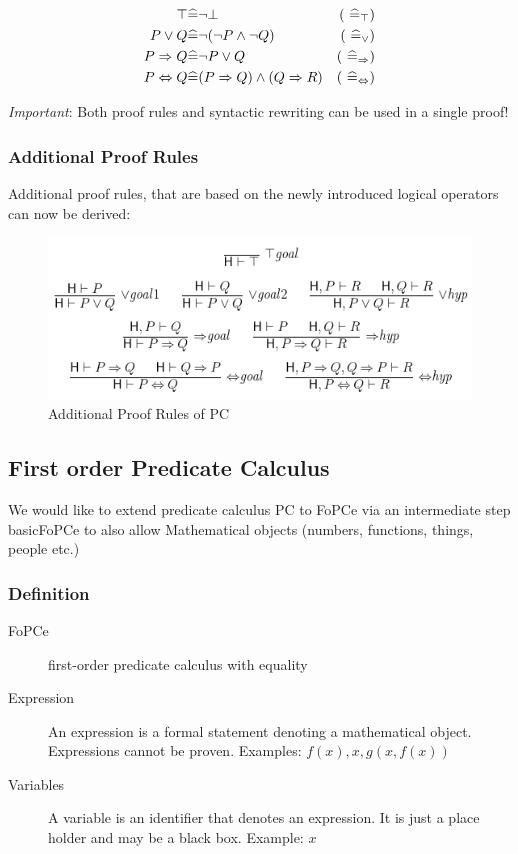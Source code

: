 \begin{align*}
	\top & \widehat{=} \neg \bot 
	& \text{( $\widehat{=}_{\top}$)} \\
	P \lor Q & \widehat{=} \neg(\neg P \land \neg Q)
	& \text{( $\widehat{=}_{\lor}$)} \\
	P \Rightarrow Q & \widehat{=} \neg P \lor Q
	& \text{( $\widehat{=}_{\Rightarrow}$)} \\
	P \Leftrightarrow Q & \widehat{=} (P\Rightarrow Q) \land (Q \Rightarrow R)
	& \text{( $\widehat{=}_{\Leftrightarrow}$)} \\
\end{align*}

\emph{Important}: Both proof rules and syntactic rewriting can be used in a single proof!

\subsubsection{Additional Proof Rules}

Additional proof rules, that are based on the newly introduced logical operators can now be derived:

\begin{figure}[h]
\centering
\includegraphics[width=0.7\linewidth]{images/pc_additional_proof_rules}
\caption{Additional Proof Rules of PC}
\label{fig:pcadditionalproofrules}
\end{figure}



\subsection{First order Predicate Calculus}

We would like to extend predicate calculus PC to FoPCe via an intermediate step basicFoPCe to also allow Mathematical objects (numbers, functions, things, people etc.)

\subsubsection{Definition}

\begin{description}
	\item[FoPCe] first-order predicate calculus with equality
	\item[Expression] An expression is a formal statement denoting a mathematical object. Expressions cannot be proven. Examples: $f(x), x, g(x, f(x))$
	\item[Variables] A variable is an identifier that denotes an expression. It is just a place holder and may be a black box. Example: $x$
\end{description}

